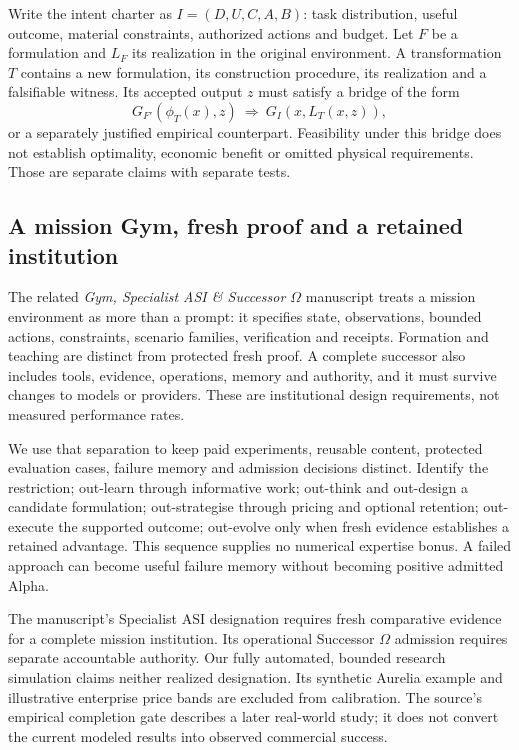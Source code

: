 \documentclass[11pt,a4paper]{article}
\begin{document}
Write the intent charter as $I=(D,U,C,A,B)$: task distribution, useful outcome, material constraints, authorized actions and budget. Let $F$ be a formulation and $L_F$ its realization in the original environment. A transformation $T$ contains a new formulation, its construction procedure, its realization and a falsifiable witness. Its accepted output $z$ must satisfy a bridge of the form
\begin{equation}
  G_{F'}(\phi_T(x),z)\ \Longrightarrow\ G_I(x,L_T(x,z)),
\end{equation}
or a separately justified empirical counterpart. Feasibility under this bridge does not establish optimality, economic benefit or omitted physical requirements. Those are separate claims with separate tests.

\subsection{A mission Gym, fresh proof and a retained institution}

The related \emph{Gym, Specialist ASI \& Successor $\Omega$} manuscript treats a mission environment as more than a prompt: it specifies state, observations, bounded actions, constraints, scenario families, verification and receipts. Formation and teaching are distinct from protected fresh proof. A complete successor also includes tools, evidence, operations, memory and authority, and it must survive changes to models or providers. These are institutional design requirements, not measured performance rates.\cite{Gym}

We use that separation to keep paid experiments, reusable content, protected evaluation cases, failure memory and admission decisions distinct. Identify the restriction; out-learn through informative work; out-think and out-design a candidate formulation; out-strategise through pricing and optional retention; out-execute the supported outcome; out-evolve only when fresh evidence establishes a retained advantage. This sequence supplies no numerical expertise bonus. A failed approach can become useful failure memory without becoming positive admitted Alpha.

The manuscript's Specialist ASI designation requires fresh comparative evidence for a complete mission institution. Its operational Successor $\Omega$ admission requires separate accountable authority. Our fully automated, bounded research simulation claims neither realized designation. Its synthetic Aurelia example and illustrative enterprise price bands are excluded from calibration. The source's empirical completion gate describes a later real-world study; it does not convert the current modeled results into observed commercial success.\cite{Gym}
\end{document}
